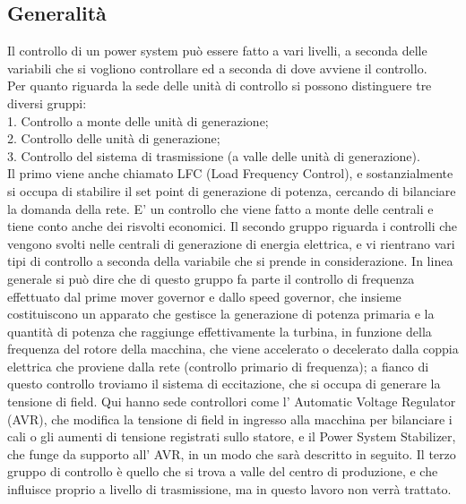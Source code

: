\documentclass[Lau,noexaminfo]{sapthesis}
\begin{document}
	\subsection{Generalità}
	Il controllo di un power system può essere fatto a vari livelli, a seconda delle variabili che si vogliono controllare ed a seconda di dove avviene il controllo.\\
	Per quanto riguarda la sede delle unità di controllo si possono distinguere tre diversi gruppi:\\
	1. Controllo a monte delle unità di generazione;\\
	2. Controllo delle unità di generazione;\\
	3. Controllo del sistema di trasmissione (a valle delle unità di generazione).\\
	Il primo viene anche chiamato LFC (Load Frequency Control), e sostanzialmente si occupa di stabilire il set point di generazione di potenza, cercando di bilanciare la domanda della rete. E' un controllo che viene fatto a monte delle centrali e tiene conto anche dei risvolti economici. Il secondo gruppo riguarda i controlli che vengono svolti nelle centrali di generazione di energia elettrica, e vi rientrano vari tipi di controllo a seconda della variabile che si prende in considerazione. In linea generale si può dire che di questo gruppo fa parte il controllo di frequenza effettuato dal prime mover governor e dallo speed governor, che insieme costituiscono un apparato che gestisce la generazione di potenza primaria e la quantità di potenza che raggiunge effettivamente la turbina, in funzione della frequenza del rotore della macchina, che viene accelerato o decelerato dalla coppia elettrica che proviene dalla rete (controllo primario di frequenza);
	a fianco di questo controllo troviamo il sistema di eccitazione, che si occupa di generare la tensione di field. Qui hanno sede controllori come l' Automatic Voltage Regulator (AVR), che modifica la tensione di field in ingresso alla macchina per bilanciare i cali o gli aumenti di tensione registrati sullo statore, e il Power System Stabilizer, che funge da supporto all' AVR, in un modo che sarà descritto in seguito. Il terzo gruppo di controllo è quello che si trova a valle del centro di produzione, e che influisce proprio a livello di trasmissione, ma in questo lavoro non verrà trattato.
\end{document}
